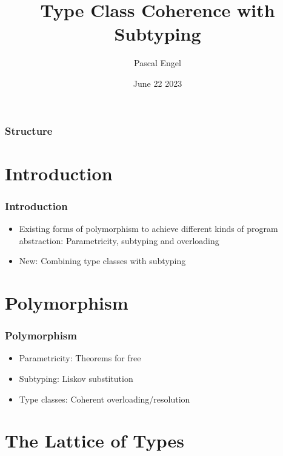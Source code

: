 \documentclass{beamer}
\title{Type Class Coherence with Subtyping}
\author{Pascal Engel}
\date{June 22 2023}
\begin{document}
\begin{frame}
    \maketitle
\end{frame}

\begin{frame}
    \frametitle{Structure}
    \tableofcontents
\end{frame}

\section{Introduction}

\begin{frame}
    \frametitle{Introduction}

    \begin{itemize}
        \item Existing forms of polymorphism to achieve different kinds of program abstraction: Parametricity, subtyping and overloading
        \item New: Combining type classes with subtyping
    \end{itemize}
\end{frame}

\section{Polymorphism}

\begin{frame}
    \frametitle{Polymorphism}

    \begin{itemize}
      \item Parametricity: Theorems for free
      \item Subtyping: Liskov substitution
      \item Type classes: Coherent overloading/resolution
    \end{itemize}
\end{frame}

\section{The Lattice of Types}
\end{document}
